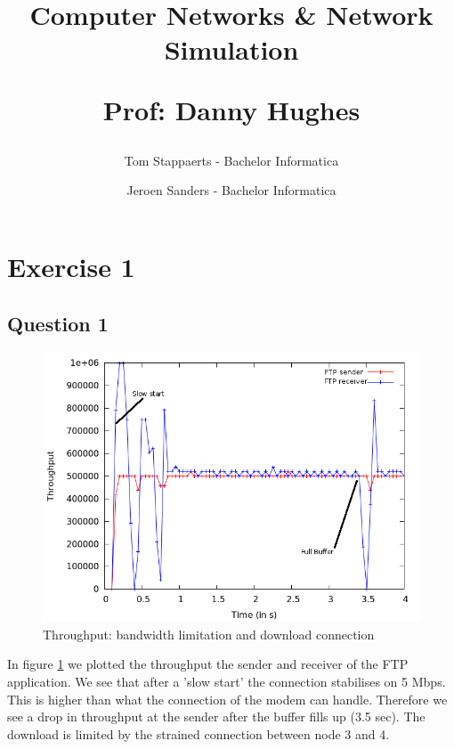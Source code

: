 \documentclass[11pt,a4paper]{article}
\author{Tom Stappaerts - Bachelor Informatica \and Jeroen Sanders - Bachelor Informatica}
\title{Computer Networks \& Network Simulation \\ \begin{small} Prof: Danny Hughes\end{small}}
\begin{document}
\maketitle
\newpage 

\section{Exercise 1}

\subsection{Question 1}
\begin{figure}[h!]
 \centering
 \includegraphics[width = 0.8\linewidth]{./output-ex1-part1-2-5.png}
 \caption{Throughput: bandwidth limitation and download connection}
 \label{fig:Q1}
\end{figure}
In figure \ref{fig:Q1} we plotted the throughput the sender and receiver of the FTP application. We see that after a 'slow start' the connection stabilises on 5 Mbps.
This is higher than what the connection of the modem can handle. Therefore we see a drop in throughput at the sender after the buffer fills up (3.5 sec). The download is limited by the strained connection between node 3 and 4.
\end{document}
